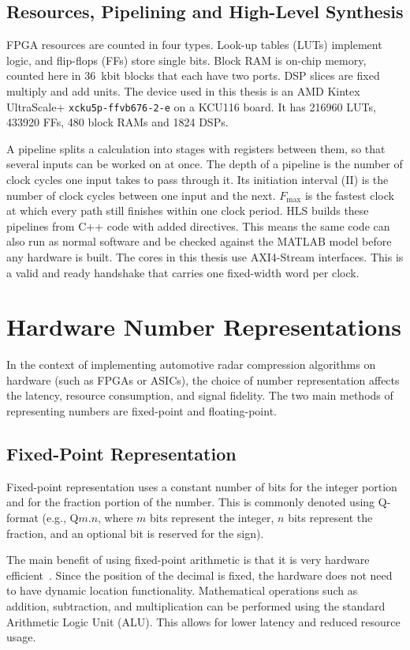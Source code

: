 \subsection{Resources, Pipelining and High-Level Synthesis}
\label{sec:pipelining}
FPGA resources are counted in four types. Look-up tables (LUTs) implement
logic, and flip-flops (FFs) store single bits. Block RAM is on-chip memory,
counted here in \SI{36}{\kilo bit} blocks that each have two ports. DSP slices
are fixed multiply and add units. The device used in this thesis is an AMD
Kintex UltraScale+ \texttt{xcku5p-ffvb676-2-e} on a KCU116 board. It has
\num{216960} LUTs, \num{433920} FFs, 480 block RAMs and \num{1824} DSPs.

A pipeline splits a calculation into stages with registers between them, so
that several inputs can be worked on at once. The depth of a pipeline is the
number of clock cycles one input takes to pass through it. Its initiation
interval (II) is the number of clock cycles between one input and the next.
$F_{\max}$ is the fastest clock at which every path still finishes within one
clock period. HLS builds these pipelines from C++ code with added directives.
This means the same code can also run as normal software and be checked against
the MATLAB model before any hardware is built. The cores in this thesis use
AXI4-Stream interfaces. This is a valid and ready handshake that carries one
fixed-width word per clock.

\section{Hardware Number Representations}
\label{sec:numbers}
In the context of implementing automotive radar compression algorithms on hardware (such as FPGAs or ASICs), the choice of number representation affects the latency, resource consumption, and signal fidelity. The two main methods of representing numbers are fixed-point and floating-point.

\subsection{Fixed-Point Representation}
Fixed-point representation uses a constant number of bits for the integer portion and for the fraction portion of the number. This is commonly denoted using Q-format (e.g., Q$m.n$, where $m$ bits represent the integer, $n$ bits represent the fraction, and an optional bit is reserved for the sign).

The main benefit of using fixed-point arithmetic is that it is very hardware efficient~\cite{parhami2010}. Since the position of the decimal is fixed, the hardware does not need to have dynamic location functionality. Mathematical operations such as addition, subtraction, and multiplication can be performed using the standard Arithmetic Logic Unit (ALU). This allows for lower latency and reduced resource usage.

